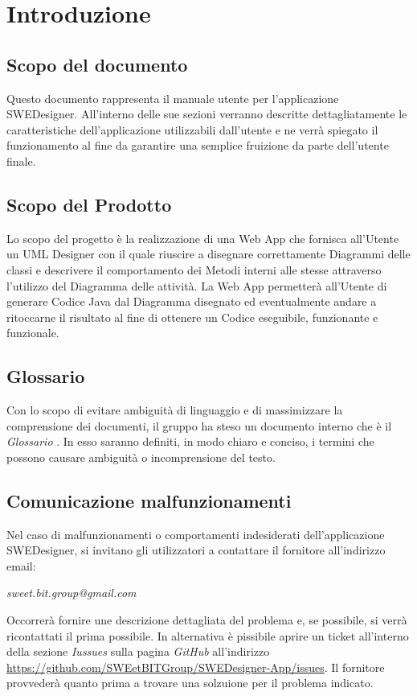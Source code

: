 \section{Introduzione}
  \subsection{Scopo del documento}
          Questo documento rappresenta il manuale utente per l'applicazione SWEDesigner.
          All'interno delle sue sezioni verranno descritte dettagliatamente le caratteristiche dell'applicazione utilizzabili dall'utente e ne verrà spiegato il funzionamento
          al fine da garantire una semplice fruizione da parte dell'utente finale.
  \subsection{Scopo del Prodotto}
          Lo scopo del progetto è la realizzazione di una Web App che fornisca all'Utente un UML Designer con il quale riuscire a disegnare correttamente Diagrammi delle classi
          e descrivere il comportamento dei Metodi interni alle stesse attraverso l'utilizzo del Diagramma delle attività.
          La Web App permetterà all'Utente di generare Codice Java dal Diagramma disegnato ed eventualmente andare a ritoccarne il risultato al fine di ottenere un Codice
          eseguibile, funzionante e funzionale.
  \subsection{Glossario}
          Con lo scopo di evitare ambiguità di linguaggio e di massimizzare la comprensione dei documenti, il
          gruppo ha steso un documento interno che è il \emph{Glossario \VersioneG{}}. In esso saranno definiti, in modo
          chiaro e conciso, i termini che possono causare ambiguità o incomprensione del testo.
  \subsection{Comunicazione malfunzionamenti}
  Nel caso di malfunzionamenti o comportamenti indesiderati dell'applicazione SWEDesigner, si invitano gli utilizzatori a contattare il fornitore all'indirizzo email:\\
  \begin{center}
  \emph{sweet.bit.group@gmail.com}
  \end{center}
Occorrerà fornire une descrizione dettagliata del problema e, se possibile, si verrà ricontattati il prima possibile.
In alternativa è pissibile aprire un ticket all'interno della sezione \emph{Iussues} sulla pagina \emph{GitHub} all'indirizzo \url{https://github.com/SWEetBITGroup/SWEDesigner-App/issues}. Il fornitore provvederà quanto prima
a trovare una solzuione per il problema indicato.
